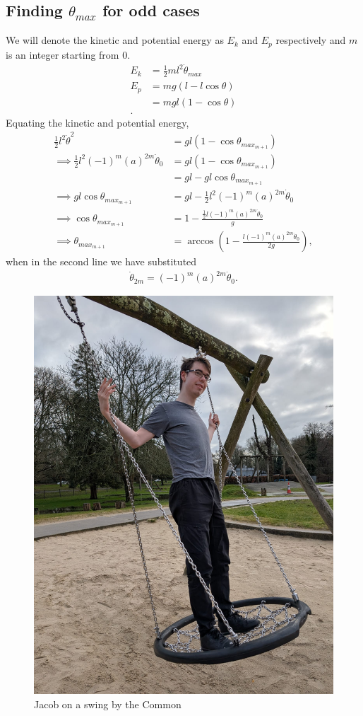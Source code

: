 \documentclass[12pt]{article}
\begin{document}
\subsection{Finding $\theta_{max}$ for odd cases}
\label{appendix:theta_max}
We will denote the kinetic and potential energy as $E_k$ and $E_p$ respectively and $m$ is an integer starting from $0$.
\begin{align}
    E_k &= \frac{1}{2}ml^2\Dot{\theta}_{max} \\
    E_p &= mg(l-l\cos\theta) \\
    &= mgl(1-\cos\theta) \\.
\end{align}
Equating the kinetic and potential energy,
\begin{align}
    \frac{1}{2}l^2\Dot{\theta}^2 &= gl(1-\cos\theta_{max_{m+1}}) \\
    \implies \frac{1}{2}l^2(-1)^m (a)^{2m}\Dot{\theta}_0 &= gl(1-\cos\theta_{max_{m+1}}) \\
    &= gl-gl\cos\theta_{max_{m+1}} \\
    \implies gl\cos\theta_{max_{m+1}} &= gl - \frac{1}{2}l^2(-1)^m (a)^{2m}\Dot{\theta}_0 \\
    \implies \cos\theta_{max_{m+1}} &= 1-\frac{\frac{1}{2}l(-1)^m (a)^{2m}\Dot{\theta}_0}{g}\\
    \implies \theta_{max_{m+1}} &= \arccos\left(1-\frac{l(-1)^m (a)^{2m}\Dot{\theta}_0}{2g}\right),
\end{align}
when in the second line we have substituted 
\begin{align}
    \Dot{\theta}_{2m} = (-1)^m (a)^{2m}\Dot{\theta}_0.
\end{align}

\begin{figure}{}
    \centering
    \includegraphics[width=0.5\linewidth]{Figures/jacobonaswing.jpeg}
    \caption{Jacob on a swing by the Common}
    \label{fig:enter-label}
\end{figure}
\end{document}

